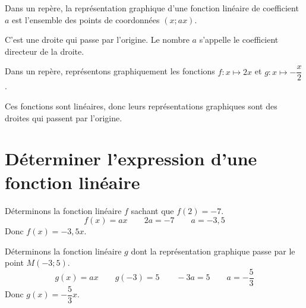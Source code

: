 \documentclass[a4paper,10pt]{report}
\begin{document}
\begin{prop}
Dans un repère, la représentation graphique d'une fonction linéaire de coefficient $a$ est l'ensemble des points de coordonnées $(x; ax)$.

\medskip
C'est une droite qui passe par l'origine. Le nombre $a$ s'appelle le coefficient directeur de la droite.
\end{prop}

\begin{ex}
Dans un repère, représentons graphiquement les fonctions $f : x \mapsto 2x$ et $g : x \mapsto -\dfrac{x}{2}$.

\medskip
Ces fonctions sont linéaires, donc leurs représentations graphiques sont des droites qui passent par l'origine.
\begin{center}
\end{center}
\end{ex}

\section{Déterminer l'expression d'une fonction linéaire}

\begin{meth}
Déterminons la fonction linéaire $f$ sachant que $f(2)=-7$.
\[
f(x)=ax \qquad 2a=-7 \qquad a=-3,5
\]
Donc $f(x)=-3,5x$.
\end{meth}

\begin{meth}
Déterminons la fonction linéaire $g$ dont la représentation graphique passe par le point $M(-3;5)$.
\[
g(x)=ax \qquad g(-3)=5 \qquad -3a=5 \qquad a=-\frac{5}{3}
\]
Donc $g(x)=-\dfrac{5}{3}x$.
\end{meth}
\end{document}
